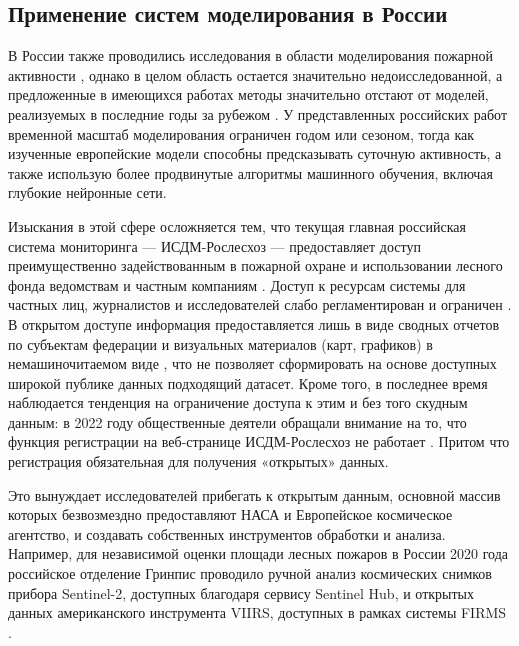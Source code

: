 \documentclass[a4paper,article,14pt]{extarticle}
\begin{document}
\subsection{Применение систем моделирования в России}
 
В России также проводились исследования в области моделирования пожарной активности \cite{GeoinformacionnoeModelirovanieRiska2019, PerspektivyProstranstvennogoAnaliza2014}, однако в целом область остается значительно недоисследованной, а предложенные в имеющихся работах методы значительно отстают от моделей, реализуемых в последние годы за рубежом \cite{PimontPredictionRegionalWildfire2021, EliaEstimatingProbabilityWildfire2020, LiangNeuralNetworkModel2019}. У представленных российских работ временной масштаб моделирования ограничен годом или сезоном, тогда как изученные европейские модели способны предсказывать суточную активность, а также использую более продвинутые алгоритмы машинного обучения, включая глубокие нейронные сети. 

Изыскания в этой сфере осложняется тем, что текущая главная российская система мониторинга — ИСДМ-Рослесхоз — предоставляет доступ преимущественно задействованным в пожарной охране и использовании лесного фонда ведомствам и частным компаниям \cite{PonomarevChapter10System2015}. Доступ к ресурсам системы для частных лиц, журналистов и исследователей слабо регламентирован и ограничен \cite{KosmicheskiyMonitoringLesnyh2019}. В открытом доступе информация предоставляется лишь в виде сводных отчетов по субъектам федерации и визуальных материалов (карт, графиков) в немашиночитаемом виде \cite{RukovodstvoPolzovatelyaInformacionnyh2019}, что не позволяет сформировать на основе доступных широкой публике данных подходящий датасет. Кроме того, в последнее время наблюдается тенденция на ограничение доступа к этим и без того скудным данным: в 2022 году общественные деятели обращали внимание на то, что функция регистрации на веб-странице ИСДМ-Рослесхоз не работает \cite{DostupSistemeMonitoringa}. Притом что регистрация обязательная для получения «открытых» данных.

Это вынуждает исследователей прибегать к открытым данным, основной массив которых безвозмездно предоставляют НАСА и Европейское космическое агентство, и создавать собственных инструментов обработки и анализа. Например, для независимой оценки площади лесных пожаров в России 2020 года российское отделение Гринпис проводило ручной анализ космических снимков прибора Sentinel-2, доступных благодаря сервису Sentinel Hub, и открытых данных американского инструмента VIIRS, доступных в рамках системы FIRMS \cite{OcenkaMasshtabovLesnyh2021}. 
\end{document}
